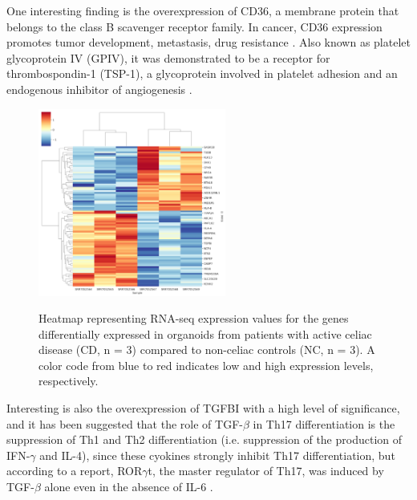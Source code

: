 \documentclass[12pt]{article}
\begin{document}
\noindent One interesting finding is the overexpression of CD36, a membrane protein that belongs to the class B scavenger receptor family. In cancer, CD36 expression promotes tumor development,
metastasis, drug resistance \supercite{guerrero2022role}. Also known as platelet glycoprotein IV (GPIV), it was demonstrated to be a receptor for thrombospondin-1 (TSP-1), a glycoprotein involved in platelet adhesion and an endogenous inhibitor of angiogenesis \supercite{feng2023role}.
\begin{figure}[H] %
    \centering
    
        \includegraphics[width=0.55\textwidth]{clustermap_symbols_quant_4.png}
        \label{fig:Heat map}
        \caption{Heatmap representing RNA-seq expression values for the genes differentially
expressed in organoids from patients with active celiac disease (CD, n = 3) compared to non-celiac controls (NC, n = 3). A color code from blue to red indicates low and high expression levels, respectively.}
\end{figure}    
\noindent Interesting is also the overexpression of TGFBI with a high level of significance, and it has been suggested that the role of TGF-$\beta$ in Th17 differentiation is the suppression of Th1 and Th2 differentiation (i.e. suppression of the production of IFN-$\gamma$ and IL-4), since these cyokines strongly inhibit Th17 differentiation, but according to a report, ROR$\gamma$t, the master regulator of Th17, was induced by TGF-$\beta$ alone even in the absence of IL-6 \supercite{ichiyama2008foxp3}.
\end{document}
